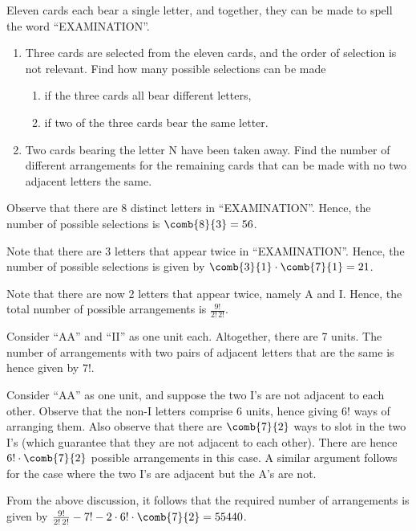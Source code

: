 \begin{problem}
    Eleven cards each bear a single letter, and together, they can be made to spell the word ``EXAMINATION''.
    \begin{enumerate}
        \item Three cards are selected from the eleven cards, and the order of selection is not relevant. Find how many possible selections can be made
        \begin{enumerate}
            \item if the three cards all bear different letters,
            \item if two of the three cards bear the same letter.
        \end{enumerate}
        \item Two cards bearing the letter N have been taken away. Find the number of different arrangements for the remaining cards that can be made with no two adjacent letters the same.
    \end{enumerate}
\end{problem}
\begin{solution}
    \begin{ppart}
        \begin{psubpart}
            Observe that there are 8 distinct letters in ``EXAMINATION''. Hence, the number of possible selections is $\comb{8}{3} = 56$.
        \end{psubpart}
        \begin{psubpart}
            Note that there are 3 letters that appear twice in ``EXAMINATION''. Hence, the number of possible selections is given by $\comb{3}{1} \cdot  \comb{7}{1} = 21$.
        \end{psubpart}
    \end{ppart}
    \begin{ppart}
        Note that there are now 2 letters that appear twice, namely A and I. Hence, the total number of possible arrangements is $\frac{9!}{2! \, 2!}$.

            Consider ``AA'' and ``II'' as one unit each. Altogether, there are 7 units. The number of arrangements with two pairs of adjacent letters that are the same is hence given by $7!$. 
            
            Consider ``AA'' as one unit, and suppose the two I's are not adjacent to each other. Observe that the non-I letters comprise 6 units, hence giving $6!$ ways of arranging them. Also observe that there are $\comb{7}{2}$ ways to slot in the two I's (which guarantee that they are not adjacent to each other). There are hence $6! \cdot \comb{7}{2}$ possible arrangements in this case. A similar argument follows for the case where the two I's are adjacent but the A's are not.

            From the above discussion, it follows that the required number of arrangements is given by $\frac{9!}{2! \, 2!} - 7! - 2 \cdot 6! \cdot \comb{7}{2} = 55440$.
    \end{ppart}
\end{solution}

